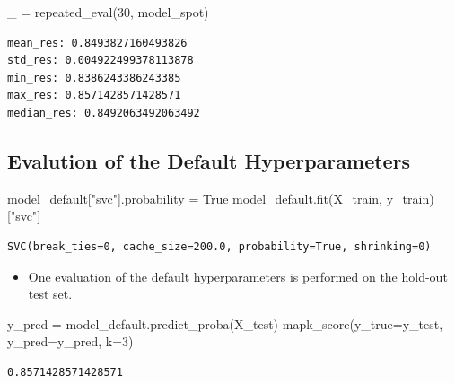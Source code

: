 \documentclass[
  letterpaper,
  DIV=11,
  numbers=noendperiod]{scrreprt}
\newenvironment{Shaded}{\begin{snugshade}}{\end{snugshade}}
\newcommand{\DecValTok}[1]{\textcolor[rgb]{0.68,0.00,0.00}{#1}}
\newcommand{\NormalTok}[1]{\textcolor[rgb]{0.00,0.23,0.31}{#1}}
\newcommand{\OperatorTok}[1]{\textcolor[rgb]{0.37,0.37,0.37}{#1}}
\newcommand{\StringTok}[1]{\textcolor[rgb]{0.13,0.47,0.30}{#1}}
\newcommand{\VariableTok}[1]{\textcolor[rgb]{0.07,0.07,0.07}{#1}}
\providecommand{\tightlist}{%
  \setlength{\itemsep}{0pt}\setlength{\parskip}{0pt}}\usepackage{longtable,booktabs,array}
\begin{document}
\begin{Shaded}
\begin{Highlighting}[]
\NormalTok{\_ }\OperatorTok{=}\NormalTok{ repeated\_eval(}\DecValTok{30}\NormalTok{, model\_spot)}
\end{Highlighting}
\end{Shaded}

\begin{verbatim}
mean_res: 0.8493827160493826
std_res: 0.004922499378113878
min_res: 0.8386243386243385
max_res: 0.8571428571428571
median_res: 0.8492063492063492
\end{verbatim}

\hypertarget{evalution-of-the-default-hyperparameters-2}{%
\subsection{Evalution of the Default
Hyperparameters}\label{evalution-of-the-default-hyperparameters-2}}

\begin{Shaded}
\begin{Highlighting}[]
\NormalTok{model\_default[}\StringTok{"svc"}\NormalTok{].probability }\OperatorTok{=} \VariableTok{True}
\NormalTok{model\_default.fit(X\_train, y\_train)[}\StringTok{"svc"}\NormalTok{]}
\end{Highlighting}
\end{Shaded}

\begin{verbatim}
SVC(break_ties=0, cache_size=200.0, probability=True, shrinking=0)
\end{verbatim}

\begin{itemize}
\tightlist
\item
  One evaluation of the default hyperparameters is performed on the
  hold-out test set.
\end{itemize}

\begin{Shaded}
\begin{Highlighting}[]
\NormalTok{y\_pred }\OperatorTok{=}\NormalTok{ model\_default.predict\_proba(X\_test)}
\NormalTok{mapk\_score(y\_true}\OperatorTok{=}\NormalTok{y\_test, y\_pred}\OperatorTok{=}\NormalTok{y\_pred, k}\OperatorTok{=}\DecValTok{3}\NormalTok{)}
\end{Highlighting}
\end{Shaded}

\begin{verbatim}
0.8571428571428571
\end{verbatim}
\end{document}
